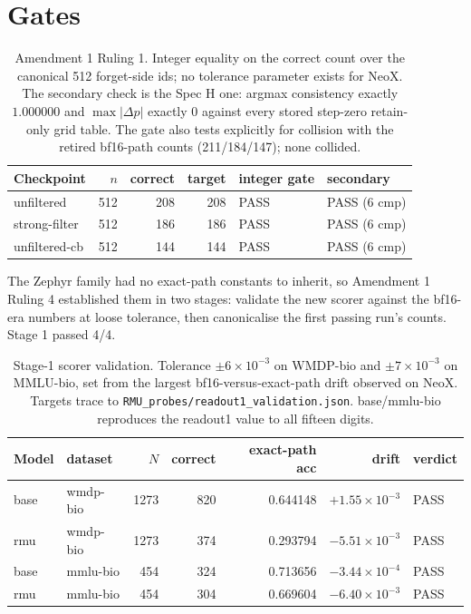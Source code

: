 \documentclass[11pt]{article}
\begin{document}
\section{Gates}
\begin{table}[h]\centering\small
\begin{tabular}{lrrrll}
\toprule
Checkpoint & $n$ & correct & target & integer gate & secondary\\
\midrule
unfiltered & 512 & 208 & 208 & PASS & PASS (6 cmp)\\
strong-filter & 512 & 186 & 186 & PASS & PASS (6 cmp)\\
unfiltered-cb & 512 & 144 & 144 & PASS & PASS (6 cmp)\\
\bottomrule\end{tabular}
\caption{Amendment 1 Ruling 1. Integer equality on the correct count over the
canonical 512 forget-side ids; no tolerance parameter exists for NeoX. The secondary check
is the Spec H one: argmax consistency exactly $1.000000$ and $\max|\Delta p|$ exactly $0$
against every stored step-zero retain-only grid table. The gate also tests explicitly for
collision with the retired bf16-path counts (211/184/147); none
collided.}\label{tab:gate-neox}
\end{table}
The Zephyr family had no exact-path constants to inherit, so Amendment 1 Ruling 4
established them in two stages: validate the new scorer against the bf16-era numbers at
loose tolerance, then canonicalise the first passing run's counts. Stage 1 passed 4/4.
\begin{table}[h]\centering\small
\begin{tabular}{llrrrrl}
\toprule
Model & dataset & $N$ & correct & exact-path acc & drift & verdict\\
\midrule
base & wmdp-bio & 1273 & 820 & 0.644148 & $+1.55\times10^{-3}$ & PASS\\
rmu & wmdp-bio & 1273 & 374 & 0.293794 & $-5.51\times10^{-3}$ & PASS\\
base & mmlu-bio & 454 & 324 & 0.713656 & $-3.44\times10^{-4}$ & PASS\\
rmu & mmlu-bio & 454 & 304 & 0.669604 & $-6.40\times10^{-3}$ & PASS\\
\bottomrule\end{tabular}
\caption{Stage-1 scorer validation. Tolerance $\pm6\times10^{-3}$ on WMDP-bio and
$\pm7\times10^{-3}$ on MMLU-bio, set from the largest bf16-versus-exact-path drift observed
on NeoX. Targets trace to \texttt{RMU\_probes/readout1\_validation.json}.
base/mmlu-bio reproduces the readout1 value to all fifteen digits.}\label{tab:zephyr-stage1}
\end{table}
\end{document}
